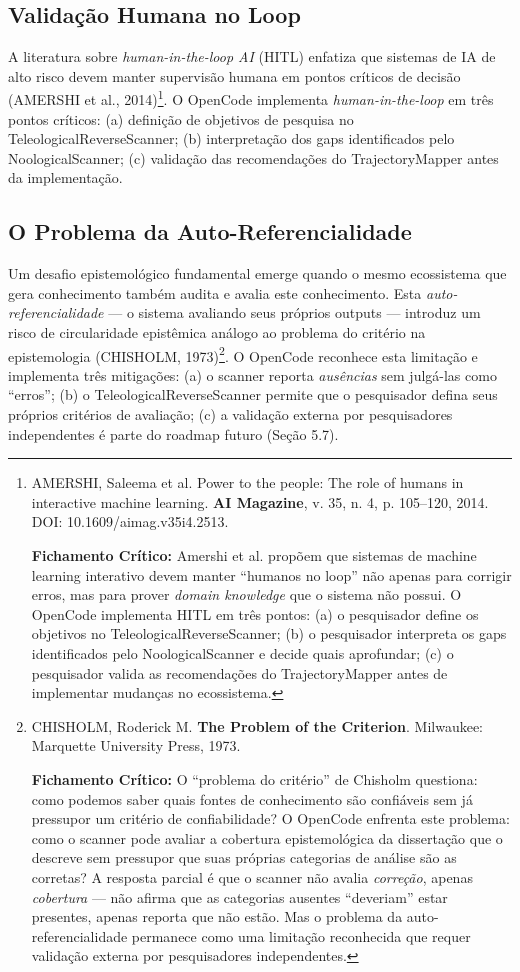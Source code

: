 \subsection{Validação Humana no Loop}

A literatura sobre \textit{human-in-the-loop AI} (HITL) enfatiza que sistemas de IA de alto risco devem manter supervisão humana em pontos críticos de decisão (AMERSHI et al., 2014)\footnote{
  AMERSHI, Saleema et al. Power to the people: The role of humans in interactive machine learning. \textbf{AI Magazine}, v. 35, n. 4, p. 105--120, 2014. DOI: 10.1609/aimag.v35i4.2513.

  \textbf{Fichamento Crítico:} Amershi et al. propõem que sistemas de machine learning interativo devem manter ``humanos no loop'' não apenas para corrigir erros, mas para prover \textit{domain knowledge} que o sistema não possui. O OpenCode implementa HITL em três pontos: (a) o pesquisador define os objetivos no TeleologicalReverseScanner; (b) o pesquisador interpreta os gaps identificados pelo NoologicalScanner e decide quais aprofundar; (c) o pesquisador valida as recomendações do TrajectoryMapper antes de implementar mudanças no ecossistema.
}. O OpenCode implementa \textit{human-in-the-loop} em três pontos críticos: (a) definição de objetivos de pesquisa no TeleologicalReverseScanner; (b) interpretação dos gaps identificados pelo NoologicalScanner; (c) validação das recomendações do TrajectoryMapper antes da implementação.

\subsection{O Problema da Auto-Referencialidade}

Um desafio epistemológico fundamental emerge quando o mesmo ecossistema que gera conhecimento também audita e avalia este conhecimento. Esta \textit{auto-referencialidade} --- o sistema avaliando seus próprios outputs --- introduz um risco de circularidade epistêmica análogo ao problema do critério na epistemologia (CHISHOLM, 1973)\footnote{
  CHISHOLM, Roderick M. \textbf{The Problem of the Criterion}. Milwaukee: Marquette University Press, 1973.

  \textbf{Fichamento Crítico:} O ``problema do critério'' de Chisholm questiona: como podemos saber quais fontes de conhecimento são confiáveis sem já pressupor um critério de confiabilidade? O OpenCode enfrenta este problema: como o scanner pode avaliar a cobertura epistemológica da dissertação que o descreve sem pressupor que suas próprias categorias de análise são as corretas? A resposta parcial é que o scanner não avalia \textit{correção}, apenas \textit{cobertura} --- não afirma que as categorias ausentes ``deveriam'' estar presentes, apenas reporta que não estão. Mas o problema da auto-referencialidade permanece como uma limitação reconhecida que requer validação externa por pesquisadores independentes.
}. O OpenCode reconhece esta limitação e implementa três mitigações: (a) o scanner reporta \textit{ausências} sem julgá-las como ``erros''; (b) o TeleologicalReverseScanner permite que o pesquisador defina seus próprios critérios de avaliação; (c) a validação externa por pesquisadores independentes é parte do roadmap futuro (Seção 5.7).

\newpage
